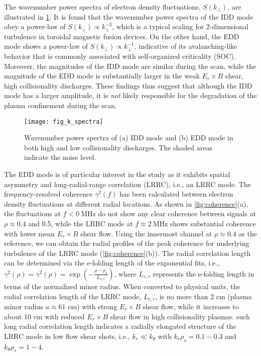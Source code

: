 \documentclass[english,aip,pop,superscriptaddress,preprint,letterpaper]{revtex4-2}
\begin{document}
The wavenumber power spectra of electron density fluctuations, $ S(k_\perp) $, are illustrated in \cref{fig:k_spectra}.
It is found that the wavenumber power spectra of the IDD mode obey a power-law of $S(k_{\perp})\propto k_{\perp}^{-3}$, which is a typical scaling for 2-dimensional turbulence in toroidal magnetic fusion devices.
On the other hand, the EDD mode shows a power-law of $S(k_{\perp})\propto k_{\perp}^{-1}$, indicative of its avalanching-like behavior that is commonly associated with self-organized criticality (SOC).\cite{diamondDynamicsTurbulentTransport1995,bakSelforganizedCriticalityExplanation1987}
Moreover, the magnitudes of the IDD mode are similar during the scan, while the magnitude of the EDD mode is substantially larger in the weak $E_{r}\times B$ shear, high collisionality discharges.
These findings thus suggest that although the IDD mode has a larger amplitude, it is \emph{not} likely responsible for the degradation of the plasma confinement during the scan.

\begin{figure}
    \texttt{[image: fig\_k\_spectra]}
    \caption{\label{fig:k_spectra}Wavenumber power spectra of (a) IDD mode and (b) EDD mode in both high and low collisionality discharges. The shaded areas indicate the noise level.}
\end{figure}

The EDD mode is of particular interest in the study as it exhibits spatial asymmetry and long-radial-range correlation (LRRC), i.e., an LRRC mode.
The frequency-resolved coherence $\gamma^{2}(f)$ has been calculated between electron density fluctuations at different radial locations. 
As shown in \cref{fig:coherence}(a), the fluctuations at $f<\SI{0}{\mega\hertz}$ do not show any clear coherence between signals at $\rho\approx0.4$ and 0.5, while the LRRC mode at $f\approx\SI{2}{\mega\hertz}$ shows substantial coherence with lower mean $E_{r}\times B$ shear flow.
Using the innermost channel at $\rho\approx0.4$ as the reference, we can obtain the radial profiles of the peak coherence for underlying turbulence of the LRRC mode (\cref{fig:coherence}(b)).
The radial correlation length can be determined via the e-folding length of the exponential fits, i.e., $\gamma^{2}(\rho)=\gamma^{2}(\rho)=\exp(-\frac{\rho-\rho_{0}}{L_{c,r}})$, where $L_{c,r}$ represents the e-folding length in terms of the normalized minor radius. 
When converted to physical units, the radial correlation length of the LRRC mode, $L_{c,r}$, is no more than 2 cm (plasma minor radius $a\approx61$ cm) with strong $E_{r}\times B$ shear flow, while it increases to about 10 cm with reduced $E_{r}\times B$ shear flow in high collisionality plasmas.
such long radial correlation length indicates a radially elongated structure of the LRRC mode in low flow shear shots, i.e., $k_{r}\ll k_{\theta}$ with $k_{r}\rho_{s}=0.1-0.3$ and $k_{\theta}\rho_{s}=1-4$.
\end{document}
